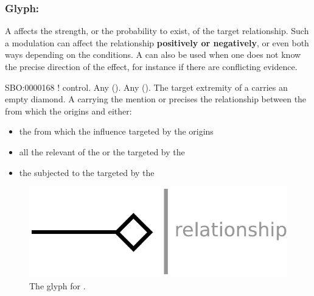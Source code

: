 \subsubsection{Glyph: }\label{sec:modulation}

A  affects the strength, or the probability to exist, of the target relationship. Such a modulation can affect the relationship \textbf{positively or negatively}, or even both ways depending on the conditions. A  can also be used when one does not know the precise direction of the effect, for instance if there are conflicting evidence.

\begin{glyphDescription}
 \glyphSboTerm SBO:0000168 ! control.
 \glyphOrigin Any  ().
 \glyphTarget Any  ().
 \glyphEndPoint The target extremity of a  carries an empty diamond.
 \glyphAux A  carrying the mention  or  precises the relationship between the  from which the  origins and either:
\begin{itemize}
\item the  from which the influence targeted by the  origins
\item all the relevant  of the  or the  targeted by the 
\item the  subjected to the  targeted by the 
\end{itemize}
 \end{glyphDescription}

\begin{figure}[H]
  \centering
  \includegraphics[scale = 0.5]{images/modulation}
  \caption{The \ER glyph for .}
  \label{fig:modulation}
\end{figure}
 
